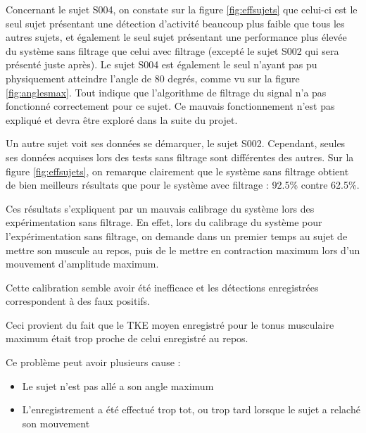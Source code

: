 \documentclass[letterpaper, twoside, 12pt, memoire, creativecommons, hyperref]{thETS}
\begin{document}
Concernant le sujet S004, on constate sur la figure \ref{fig:effsujets} que celui-ci est le seul sujet présentant une détection d'activité beaucoup plus faible que tous les autres sujets, et également le seul sujet présentant une performance plus élevée du système sans filtrage que celui avec filtrage (excepté le sujet S002 qui sera présenté juste après). Le sujet S004 est également le seul n'ayant pas pu physiquement atteindre l'angle de 80 degrés, comme vu sur la figure \ref{fig:anglesmax}. Tout indique que l'algorithme de filtrage du signal n'a pas fonctionné correctement pour ce sujet. Ce mauvais fonctionnement n'est pas expliqué et devra être exploré dans la suite du projet.

Un autre sujet voit ses données se démarquer, le sujet S002. Cependant, seules ses données acquises lors des tests sans filtrage sont différentes des autres. Sur la figure \ref{fig:effsujets}, on remarque clairement que le système sans filtrage obtient de bien meilleurs résultats que pour le système avec filtrage : 92.5\% contre 62.5\%. 

Ces résultats s'expliquent par un mauvais calibrage du système lors des expérimentation sans filtrage. En effet, lors du calibrage du système pour l'expérimentation sans filtrage, on demande dans un premier temps au sujet de mettre son muscule au repos, puis de le mettre en contraction maximum lors d'un mouvement d'amplitude maximum. 

Cette calibration semble avoir été inefficace et les détections enregistrées correspondent à des faux positifs. 


Ceci provient du fait que le TKE moyen enregistré pour le tonus musculaire maximum était trop proche de celui enregistré au repos. 

Ce problème peut avoir plusieurs cause : 

\begin{itemize}
 \item Le sujet n'est pas allé a son angle maximum
 \item L'enregistrement a été effectué trop tot, ou trop tard lorsque le sujet a relaché son mouvement
\end{itemize}
\end{document}

